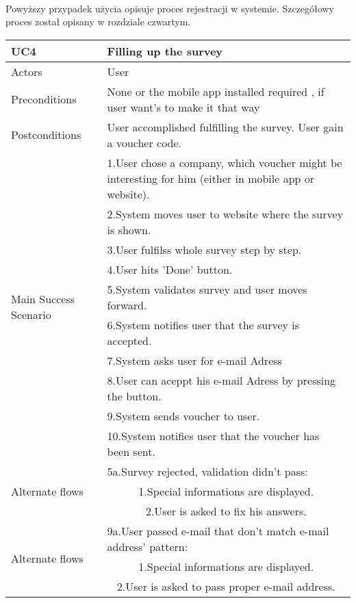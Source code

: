 \paragraph{}
Powyższy przypadek użycia opisuje proces rejestracji w systemie. Szczegółowy proces został opisany w rozdziale czwartym.
	
	\begin{table}[H]
	\centering
	\sffamily\captionsetup{justification=raggedright,singlelinecheck=false,position = below, font = sf}
	\begin{tabular}{|m{3.5cm}|m{11cm}|}
	\hline 
	UC4 & Filling up the survey \\
	\hline
	Actors & User \\ 
	\hline
	Preconditions & None or the mobile app installed required , if user want's to make it that way \\
	\hline
	Postconditions & User accomplished fulfilling the survey. User gain a voucher code. \\
	\multirow{10}{*}{Main Success Scenario} & 1.User chose a company, which voucher might be interesting for him (either in mobile app or website). \\
	\cline{2-2}
	& 2.System moves user to website where the survey is shown. \\
	\cline{2-2}
	& 3.User fulfilss whole survey step by step. \\
	\cline{2-2}
	& 4.User hits 'Done' button. \\
	\cline{2-2}
	& 5.System validates survey and user moves forward. \\
	\cline{2-2}
	& 6.System notifies user that the survey is accepted. \\
	\cline{2-2}
	& 7.System asks user for e-mail Adress	 \\
	\cline{2-2}
	& 8.User can aceppt his e-mail Adress by pressing the button.  \\
	\cline{2-2}
	& 9.System sends voucher to user. \\
	\cline{2-2}
	& 10.System notifies user that the voucher has been sent. \\
	\hline
	\multirow{3}{*}{Alternate flows} & 5a.Survey rejected, validation didn't pass: \\
	\cline{2-2}
	& \multicolumn{1}{c|}{1.Special informations are displayed.} \\
	\cline{2-2}
	& \multicolumn{1}{c|}{2.User is asked to fix his answers.} \\
	\cline{2-2}
	\multirow{3}{*}{Alternate flows} & 9a.User passed e-mail that don't match e-mail address' pattern: \\
	\cline{2-2}
	& \multicolumn{1}{c|}{1.Special informations are displayed.} \\
	\cline{2-2}
	& \multicolumn{1}{c|}{2.User is asked to pass proper e-mail address.} \\
	\hline	
	\end{tabular}
	\end{table}	

